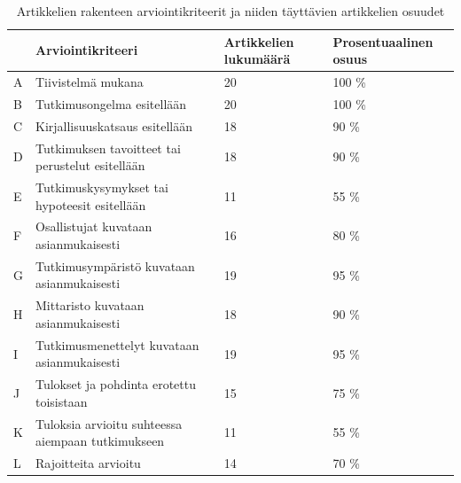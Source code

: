 \documentclass[utf8]{gradu3}
\begin{document}
\begin{table}[h]
    \footnotesize
    \begin{tabular}{llll}
        \toprule
        & \textbf{Arviointikriteeri} & \textbf{Artikkelien lukumäärä} & \textbf{Prosentuaalinen osuus} \\
        \toprule
        A & Tiivistelmä mukana & 20 & 100 \% \\
        B & Tutkimusongelma esitellään & 20 & 100 \% \\
        C & Kirjallisuuskatsaus esitellään & 18 & 90 \% \\
        D & Tutkimuksen tavoitteet tai perustelut esitellään & 18 & 90 \% \\
        E & Tutkimuskysymykset tai hypoteesit esitellään & 11 & 55 \% \\
        F & Osallistujat kuvataan asianmukaisesti & 16 & 80 \% \\
        G & Tutkimusympäristö kuvataan asianmukaisesti & 19 & 95 \% \\
        H & Mittaristo kuvataan asianmukaisesti & 18 & 90 \% \\
        I & Tutkimusmenettelyt kuvataan asianmukaisesti & 19 & 95 \% \\
        J & Tulokset ja pohdinta erotettu toisistaan & 15 & 75 \% \\
        K & Tuloksia arvioitu suhteessa aiempaan tutkimukseen & 11 & 55 \% \\
        L & Rajoitteita arvioitu & 14 & 70 \% \\
        \bottomrule
    \end{tabular}
    \caption{Artikkelien rakenteen arviointikriteerit ja niiden täyttävien artikkelien osuudet}
    \label{tbl:rakenteen-kriteerit}
\end{table}
\end{document}
